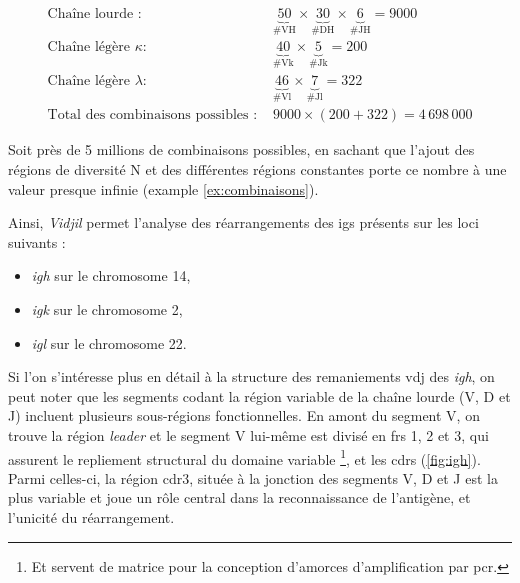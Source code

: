 \begin{examplebox}[label={ex:combinaisons}]
    \begin{equation}
        \begin{aligned}
            \text{Chaîne lourde : }                    & \underbrace{50}_{\text{\# VH}} \times \underbrace{30}_{\text{\# DH}} \times \underbrace{6}_{\text{\# JH}} = 9000 \\
            \text{Chaîne légère } \kappa :             & \underbrace{40}_{\text{\# Vk}} \times \underbrace{5}_{\text{\# Jk}} = 200                                        \\
            \text{Chaîne légère } \lambda :            & \underbrace{46}_{\text{\# Vl}} \times \underbrace{7}_{\text{\# Jl}} = 322                                        \\
            \text{Total des combinaisons possibles : } & 9000 \times (200 + 322) = 4\,698\,000
        \end{aligned}
    \end{equation}
\end{examplebox}

Soit près de 5 millions de combinaisons possibles, en sachant que l'ajout des
régions de diversité N et des différentes régions constantes porte ce nombre à
une valeur presque infinie (example \autoref{ex:combinaisons}).

\vspace{1em}

Ainsi, \textit{Vidjil} permet l'analyse des réarrangements des \glspl{ig}
présents sur les loci suivants :
\begin{itemize}
    \item \textit{\gls{igh}} sur le chromosome 14,
    \item \textit{\gls{igk}} sur le chromosome 2,
    \item \textit{\gls{igl}} sur le chromosome 22.
\end{itemize}

\vspace{1em}



Si l'on s'intéresse plus en détail à la structure des remaniements \gls{vdj}
des \textit{\gls{igh}}, on peut noter que les segments codant la région
variable de la chaîne lourde (V, D et J) incluent plusieurs sous-régions
fonctionnelles. En amont du segment V, on trouve la région \textit{leader} et
le segment V lui-même est divisé en \glspl{fr} 1, 2 et 3, qui assurent le
repliement structural du domaine variable \footnote{Et servent de matrice pour
la conception d'amorces d'amplification par \gls{pcr}.}, et les \glspl{cdr}
(\autoref{fig:igh}). Parmi celles-ci, la région \gls{cdr}3, située à la
jonction des segments V, D et J est la plus variable et joue un rôle central
dans la reconnaissance de l'antigène, et l'unicité du réarrangement.

